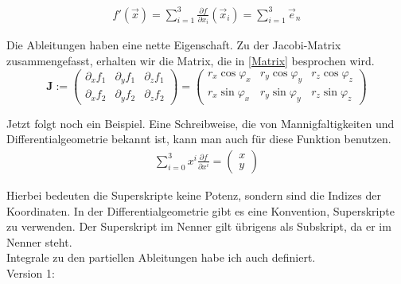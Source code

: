 \documentclass[a4paper]{article}
\begin{document}
\begin{displaymath}
\begin{align}
f'(\vec{x}) = \sum_{i=1}^{3}\frac{\partial f}{\partial x_i}(\vec{x}_i) = \sum_{i=1}^{3}\vec{e}_{n}
\end{align}
\end{displaymath}

Die Ableitungen haben eine nette Eigenschaft. Zu der Jacobi-Matrix zusammengefasst, erhalten wir die Matrix, die in \ref{Matrix} besprochen wird.\\

\begin{displaymath}
\boldsymbol{J} := \begin{pmatrix}
	\partial_x f_{1} & \partial_y f_{1} & \partial_z f_{1}\\
	\partial_x f_{2} & \partial_y f_{2} & \partial_z f_{2}
\end{pmatrix} = \begin{pmatrix}r_x \cos \varphi_x & r_y \cos \varphi_y & r_z \cos \varphi_z\\
r_x \sin \varphi_x & r_y \sin \varphi_y & r_z \sin \varphi_z \end{pmatrix}
\end{displaymath}

Jetzt folgt noch ein Beispiel. Eine Schreibweise, die von Mannigfaltigkeiten und Differentialgeometrie bekannt ist, kann man auch f\"ur diese Funktion benutzen.\\

\begin{displaymath}
\begin{align}
     \sum_{i=0}^{3}x^{i}\frac{\partial f}{\partial x^{i}} = \begin{pmatrix}x\\y\end{pmatrix}
\end{align}
\end{displaymath}

Hierbei bedeuten die Superskripte keine Potenz, sondern sind die Indizes der Koordinaten. In der Differentialgeometrie gibt es eine Konvention, Superskripte zu verwenden. Der Superskript im Nenner gilt \"ubrigens als Subskript, da er im Nenner steht.\\


Integrale zu den partiellen Ableitungen habe ich auch definiert.\\

Version 1:\\
\end{document}
